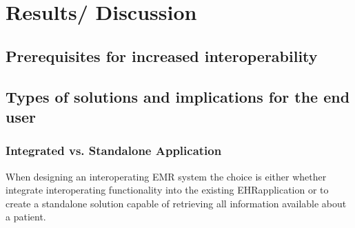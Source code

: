 \documentclass[14pt]{article}
\begin{document}

\newpage

\section{Results/ Discussion}
\label{sec:Results}

\subsection{Prerequisites for increased interoperability}
\label{sec:resultsPrereq}
\subsection{Types of solutions and implications for the end user}
\label{sec:resultsEndUser}
\subsubsection{Integrated vs. Standalone Application}
When designing an interoperating \gls{EMR} system the choice is either whether integrate interoperating functionality into the existing \gls{EHR}application or to create a standalone solution capable of retrieving all information available about a patient.
\end{document}
